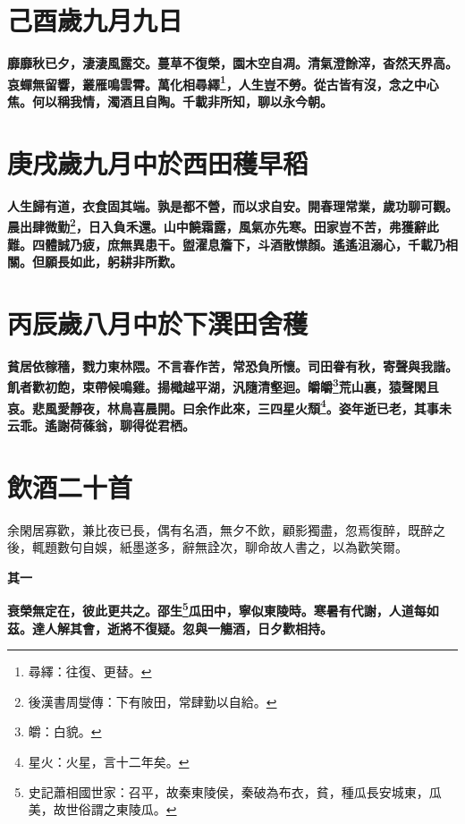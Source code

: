 \section{己酉歲九月九日}

\textbf{靡靡秋已夕，淒淒風露交。蔓草不復榮，園木空自凋。清氣澄餘滓，杳然天界高。哀蟬無留響，叢雁鳴雲霄。萬化相尋繹\footnote{尋繹：往復、更替。}，人生豈不勞。從古皆有沒，念之中心焦。何以稱我情，濁酒且自陶。千載非所知，聊以永今朝。}

\section{庚戌歲九月中於西田穫早稻}

\textbf{人生歸有道，衣食固其端。孰是都不營，而以求自安。開春理常業，歲功聊可觀。晨出肆微勤\footnote{後漢書周燮傳：下有陂田，常肆勤以自給。}，日入負禾還。山中饒霜露，風氣亦先寒。田家豈不苦，弗獲辭此難。四體誠乃疲，庶無異患干。盥濯息簷下，斗酒散㦗顏。遙遙沮溺心，千載乃相關。但願長如此，躬耕非所歎。}

\section{丙辰歲八月中於下潠田舍穫}

\textbf{貧居依稼穡，戮力東林隈。不言春作苦，常恐負所懷。司田眷有秋，寄聲與我諧。飢者歡初飽，束帶候鳴雞。揚檝越平湖，汎隨清壑迴。皭皭\footnote{皭：白貌。}荒山裏，猿聲閑且哀。悲風愛靜夜，林鳥喜晨開。曰余作此來，三四星火頹\footnote{星火：火星，言十二年矣。}。姿年逝已老，其事未云乖。遙謝荷蓧翁，聊得從君栖。}

\section{飲酒二十首\hspace{1ex}{\footnotesize 并序}}

\begin{quoting}余閑居寡歡，兼比夜已長，偶有名酒，無夕不飲，顧影獨盡，忽焉復醉，既醉之後，輒題數句自娛，紙墨遂多，辭無詮次，聊命故人書之，以為歡笑爾。\end{quoting}

\begin{quoting}\textbf{其一}\end{quoting}

\textbf{衰榮無定在，彼此更共之。邵生\footnote{史記蕭相國世家：召平，故秦東陵侯，秦破為布衣，貧，種瓜長安城東，瓜美，故世俗謂之東陵瓜。}瓜田中，寧似東陵時。寒暑有代謝，人道每如茲。達人解其會，逝將不復疑。忽與一觴酒，日夕歡相持。}

